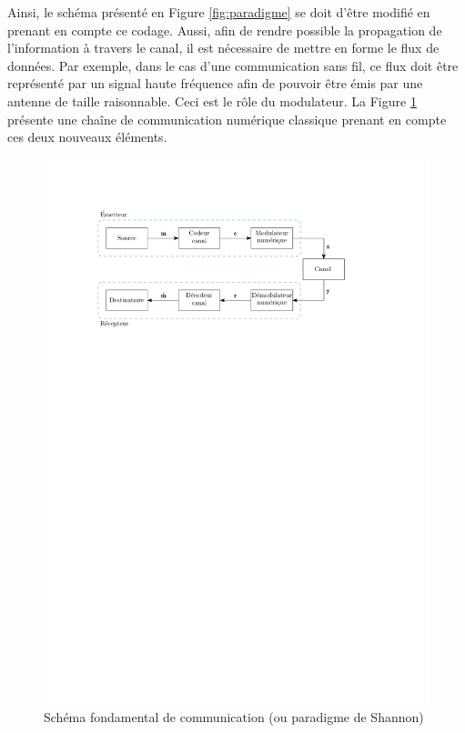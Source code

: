 Ainsi, le schéma présenté en Figure \ref{fig:paradigme} se doit d'être modifié en prenant en compte ce codage. Aussi,
afin de rendre possible la propagation de l'information à travers le canal, il est nécessaire de mettre en forme le flux 
de données. Par exemple, dans le cas d'une communication sans fil, ce flux doit être représenté par un signal haute 
fréquence afin de pouvoir être émis par une antenne de taille raisonnable. Ceci est le rôle du modulateur.
La Figure \ref{fig:paradigme2} présente une chaîne de communication numérique classique prenant en compte ces deux
nouveaux éléments.
\begin{figure}[!h]
	\centering
	\includegraphics[width=12cm]{main/ch1_fig/shParadigm2.pdf}
	\caption{\label{fig:paradigme2} Schéma fondamental de communication (ou paradigme de Shannon)}
\end{figure}

